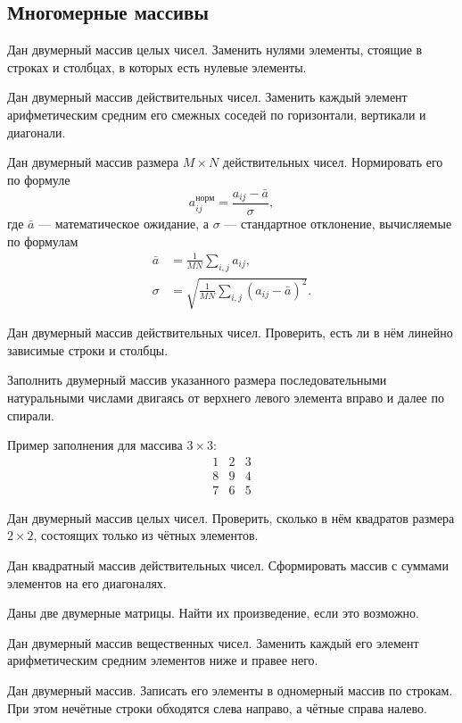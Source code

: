 \subsection{Многомерные массивы}

\task Дан двумерный массив целых чисел. Заменить нулями элементы,
стоящие в строках и столбцах, в которых есть нулевые элементы.

\task Дан двумерный массив действительных чисел. Заменить каждый элемент
арифметическим средним его смежных соседей по горизонтали, вертикали и
диагонали.

\task Дан двумерный массив размера $M\times N$ действительных
чисел. Нормировать его по формуле
\[
a_{ij}^\textrm{норм} = \frac{a_{ij}-\bar{a}}{\sigma},
\]
где $\bar{a}$ — математическое ожидание, а $\sigma$ — стандартное
отклонение, вычисляемые по формулам
\begin{align*}
  \bar{a} &= \frac{1}{MN}\sum_{i,j}a_{ij},\\
  \sigma  &= \sqrt{\frac{1}{MN}\sum_{i,j}(a_{ij}-\bar{a})^2}. 
\end{align*}

\task Дан двумерный массив действительных чисел. Проверить, есть ли в
нём линейно зависимые строки и столбцы.

\task Заполнить двумерный массив указанного размера последовательными
натуральными числами двигаясь от верхнего левого элемента вправо и
далее по спирали.

Пример заполнения для массива $3\times 3$:
\[
\begin{array}{ccc}
  1 & 2 & 3 \\
  8 & 9 & 4 \\
  7 & 6 & 5
\end{array}
\]

\task Дан двумерный массив целых чисел. Проверить, сколько в нём
квадратов размера $2\times 2$, состоящих только из чётных элементов.

\task Дан квадратный массив действительных чисел. Сформировать массив
с суммами элементов на его диагоналях.

\task Даны две двумерные матрицы. Найти их произведение, если это
возможно.

\task Дан двумерный массив вещественных чисел. Заменить каждый его
элемент арифметическим средним элементов ниже и правее него.

\task Дан двумерный массив. Записать его элементы в одномерный массив
по строкам. При этом нечётные строки обходятся слева направо, а чётные
справа налево.

